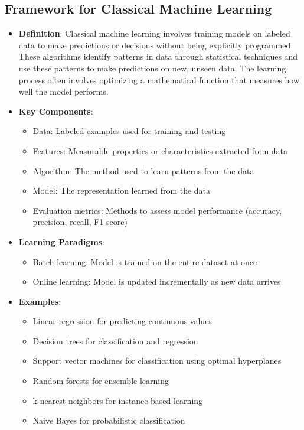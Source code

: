 \documentclass{article}
\begin{document}
\subsection{Framework for Classical Machine Learning}
\begin{itemize}
    \item \textbf{Definition}: Classical machine learning involves training models on labeled data to make predictions or decisions without being explicitly programmed. These algorithms identify patterns in data through statistical techniques and use these patterns to make predictions on new, unseen data. The learning process often involves optimizing a mathematical function that measures how well the model performs.
    
    \item \textbf{Key Components}:
    \begin{itemize}
        \item Data: Labeled examples used for training and testing
        \item Features: Measurable properties or characteristics extracted from data
        \item Algorithm: The method used to learn patterns from the data
        \item Model: The representation learned from the data
        \item Evaluation metrics: Methods to assess model performance (accuracy, precision, recall, F1 score)
    \end{itemize}
    
    \item \textbf{Learning Paradigms}:
    \begin{itemize}
        \item Batch learning: Model is trained on the entire dataset at once
        \item Online learning: Model is updated incrementally as new data arrives
    \end{itemize}
    
    \item \textbf{Examples}:
    \begin{itemize}
        \item Linear regression for predicting continuous values
        \item Decision trees for classification and regression
        \item Support vector machines for classification using optimal hyperplanes
        \item Random forests for ensemble learning
        \item k-nearest neighbors for instance-based learning
        \item Naive Bayes for probabilistic classification
    \end{itemize}
    

\end{itemize}
\end{document}
